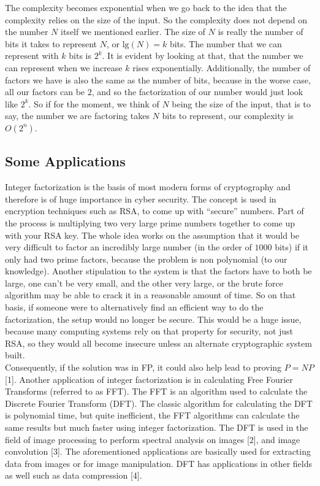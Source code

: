 	The complexity becomes exponential when we go back to the idea that the complexity relies on the size of the input. So the complexity does not depend on the number $N$ itself we mentioned earlier. The size of $N$ is really the number of bits it takes to represent $N$, or $\text{lg}(N) = k$ bits. The number that we can represent with $k$ bits is $2^k$. It is evident by looking at that, that the number we can represent when we increase $k$ rises exponentially. Additionally, the number of factors we have is also the same as the number of bits, because in the worse case, all our factors can be $2$, and so the factorization of our number would just look like $2^k$. So if for the moment, we think of $N$ being the size of the input, that is to say, the number we are factoring takes $N$ bits to represent, our complexity is $O(2^n)$.


\subsection{Some Applications}

	Integer factorization is the basis of most modern forms of cryptography and therefore is of huge importance in cyber security. The concept is used in encryption techniques such as RSA, to come up with “secure” numbers. Part of the process is multiplying two very large prime numbers together to come up with your RSA key. The whole idea works on the assumption that it would be very difficult to factor an incredibly large number (in the order of $1000$ bits) if it only had two prime factors, because the problem is non polynomial (to our knowledge). Another stipulation to the system is that the factors have to both be large, one can’t be very small, and the other very large, or the brute force algorithm may be able to crack it in a reasonable amount of time. So on that basis, if someone were to alternatively find an efficient way to do the factorization, the setup would no longer be secure. This would be a huge issue, because many computing systems rely on that property for security, not just RSA, so they would all become insecure unless an alternate cryptographic system built. \\

	Consequently, if the solution was in FP, it could also help lead to proving $P=NP$ [1]. Another application of integer factorization is in calculating Free Fourier Transforms (referred to as FFT). The FFT is an algorithm used to calculate the Discrete Fourier Transform (DFT). The classic algorithm for calculating the DFT is polynomial time, but quite inefficient, the FFT algorithms can calculate the same results but much faster using integer factorization. The DFT is used in the field of image processing to perform spectral analysis on images [2], and image convolution [3]. The aforementioned applications are basically used for extracting data from images or for image manipulation. DFT has applications in other fields as well such as data compression [4]. 